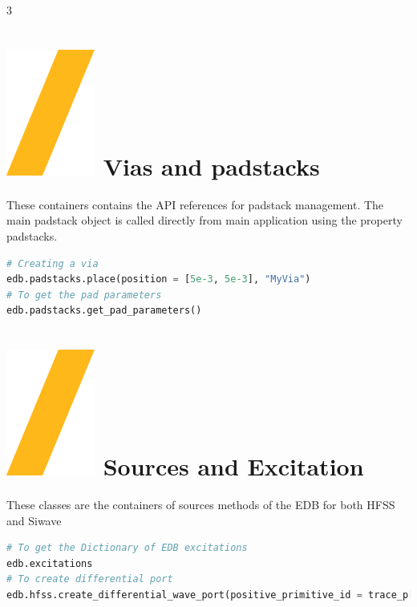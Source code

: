 \documentclass[landscape]{article}
\begin{document}
\begin{multicols}{3}
\section{\includegraphics[height=\fontcharht\font`\S]{slash.png} Vias and padstacks}
These containers contains the API references for padstack management. The main padstack object is called directly from main application using the property padstacks.
\begin{lstlisting}[language=Python]
# Creating a via
edb.padstacks.place(position = [5e-3, 5e-3], "MyVia")
# To get the pad parameters
edb.padstacks.get_pad_parameters()
\end{lstlisting}

\section{\includegraphics[height=\fontcharht\font`\S]{slash.png} Sources and Excitation}
These classes are the containers of sources methods of the EDB for both HFSS and Siwave

\begin{lstlisting}[language=Python]
# To get the Dictionary of EDB excitations
edb.excitations
# To create differential port
edb.hfss.create_differential_wave_port(positive_primitive_id = trace_p[0].id, positive_points_on_edge = p1_points, negative_primitive_id = trace_n[0].id, negative_points_on_edge = n1_points, name = "wave_port_1")



\end{lstlisting}
\end{multicols}
\end{document}
